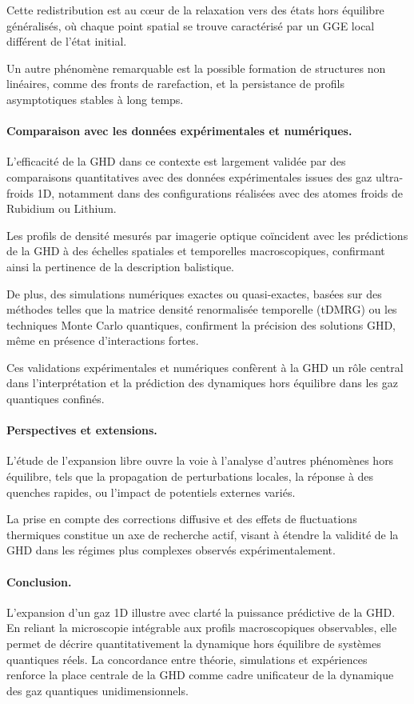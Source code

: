 Cette redistribution est au cœur de la relaxation vers des états hors équilibre généralisés, où chaque point spatial se trouve caractérisé par un GGE local différent de l’état initial.

Un autre phénomène remarquable est la possible formation de structures non linéaires, comme des fronts de rarefaction, et la persistance de profils asymptotiques stables à long temps.

\paragraph{Comparaison avec les données expérimentales et numériques.}
L’efficacité de la GHD dans ce contexte est largement validée par des comparaisons quantitatives avec des données expérimentales issues des gaz ultra-froids 1D, notamment dans des configurations réalisées avec des atomes froids de Rubidium ou Lithium.

Les profils de densité mesurés par imagerie optique coïncident avec les prédictions de la GHD à des échelles spatiales et temporelles macroscopiques, confirmant ainsi la pertinence de la description balistique.

De plus, des simulations numériques exactes ou quasi-exactes, basées sur des méthodes telles que la matrice densité renormalisée temporelle (tDMRG) ou les techniques Monte Carlo quantiques, confirment la précision des solutions GHD, même en présence d’interactions fortes.

Ces validations expérimentales et numériques confèrent à la GHD un rôle central dans l’interprétation et la prédiction des dynamiques hors équilibre dans les gaz quantiques confinés.

\paragraph{Perspectives et extensions.}
L’étude de l’expansion libre ouvre la voie à l’analyse d’autres phénomènes hors équilibre, tels que la propagation de perturbations locales, la réponse à des quenches rapides, ou l’impact de potentiels externes variés.

La prise en compte des corrections diffusive et des effets de fluctuations thermiques constitue un axe de recherche actif, visant à étendre la validité de la GHD dans les régimes plus complexes observés expérimentalement.

\paragraph{Conclusion.}
L’expansion d’un gaz 1D illustre avec clarté la puissance prédictive de la GHD. En reliant la microscopie intégrable aux profils macroscopiques observables, elle permet de décrire quantitativement la dynamique hors équilibre de systèmes quantiques réels. La concordance entre théorie, simulations et expériences renforce la place centrale de la GHD comme cadre unificateur de la dynamique des gaz quantiques unidimensionnels.


